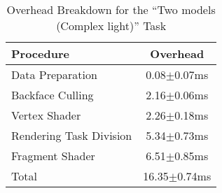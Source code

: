  
 
 
 
 


\begin{table}
\footnotesize \centering
\caption{Overhead Breakdown for the ``Two models (Complex light)'' Task} \vspace{-0.1in} 
 \label{tab:breakdown}
\begin{tabular}{lc}
\toprule
{\bf Procedure} & {\bf Overhead} \\
\midrule
Data Preparation & 0.08$\pm$0.07ms\\
Backface Culling &  2.16$\pm$0.06ms\\
Vertex Shader & 2.26$\pm$0.18ms\\
Rendering Task Division & 5.34$\pm$0.73ms \\
Fragment Shader & 6.51$\pm$0.85ms\\
\midrule
Total &  16.35$\pm$0.74ms\\
\bottomrule
\end{tabular}
\end{table}

